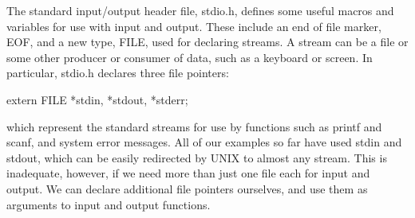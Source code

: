      The standard  input/output header  file,  
{\fn stdio.h},  defines
some  useful macros and  variables for  use with input and output.
These include an end of file marker,  {\cd EOF}, and a new type,
{\cd FILE}, used for declaring  streams. A {\kc stream\/} can be a
file  or some other producer or consumer of data, such as a keyboard
or screen. In particular, {\fn stdio.h} declares three  file
pointers:
\begin{code}
extern FILE *stdin, *stdout, *stderr;
\end{code}
\noindent
     which represent  the standard streams for use by functions such
as {\cd printf} and {\cd scanf},  and system  error messages.  All
of  our examples so far have used {\fn stdin} and {\fn stdout}, which
can be easily redirected by UNIX to almost any stream.  This is
inadequate, however, if we need more than just one file each for
input and output. We can declare additional file pointers ourselves,
and use them as arguments to input and output functions.

